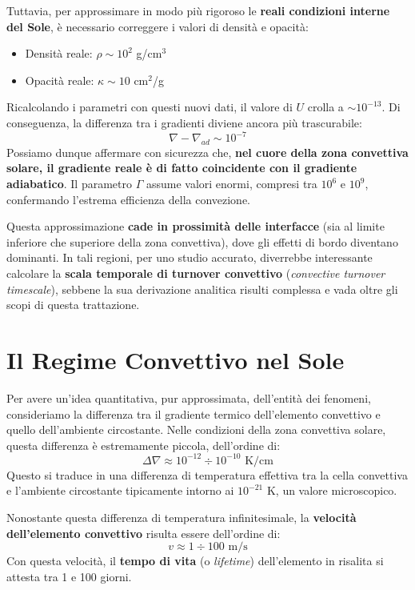 Tuttavia, per approssimare in modo più rigoroso le \textbf{reali condizioni interne del Sole}, è necessario correggere i valori di densità e opacità:
\begin{itemize}
\item Densità reale: $\rho \sim 10^2$ g/cm$^3$
\item Opacità reale: $\kappa \sim 10$ cm$^2$/g
\end{itemize}
Ricalcolando i parametri con questi nuovi dati, il valore di $U$ crolla a $\sim 10^{-13}$. Di conseguenza, la differenza tra i gradienti diviene ancora più trascurabile:
\begin{equation}
\nabla - \nabla_{ad} \sim 10^{-7}
\end{equation}
Possiamo dunque affermare con sicurezza che, \textbf{nel cuore della zona convettiva solare, il gradiente reale è di fatto coincidente con il gradiente adiabatico}. Il parametro $\Gamma$ assume valori enormi, compresi tra $10^6$ e $10^9$, confermando l'estrema efficienza della convezione.

Questa approssimazione \textbf{cade in prossimità delle interfacce} (sia al limite inferiore che superiore della zona convettiva), dove gli effetti di bordo diventano dominanti. In tali regioni, per uno studio accurato, diverrebbe interessante calcolare la \textbf{scala temporale di turnover convettivo} (\textit{convective turnover timescale}), sebbene la sua derivazione analitica risulti complessa e vada oltre gli scopi di questa trattazione.

\section{Il Regime Convettivo nel Sole}

Per avere un'idea quantitativa, pur approssimata, dell'entità dei fenomeni, consideriamo la differenza tra il gradiente termico dell'elemento convettivo e quello dell'ambiente circostante. Nelle condizioni della zona convettiva solare, questa differenza è estremamente piccola, dell'ordine di:
\begin{equation}
\Delta \nabla \approx 10^{-12} \div 10^{-10} \text{ K/cm}
\end{equation}
Questo si traduce in una differenza di temperatura effettiva tra la cella convettiva e l'ambiente circostante tipicamente intorno ai $10^{-21}$ K, un valore microscopico.

Nonostante questa differenza di temperatura infinitesimale, la \textbf{velocità dell'elemento convettivo} risulta essere dell'ordine di:
\begin{equation}
v \approx 1 \div 100 \text{ m/s}
\end{equation}
Con questa velocità, il \textbf{tempo di vita} (o \textit{lifetime}) dell'elemento in risalita si attesta tra 1 e 100 giorni.

